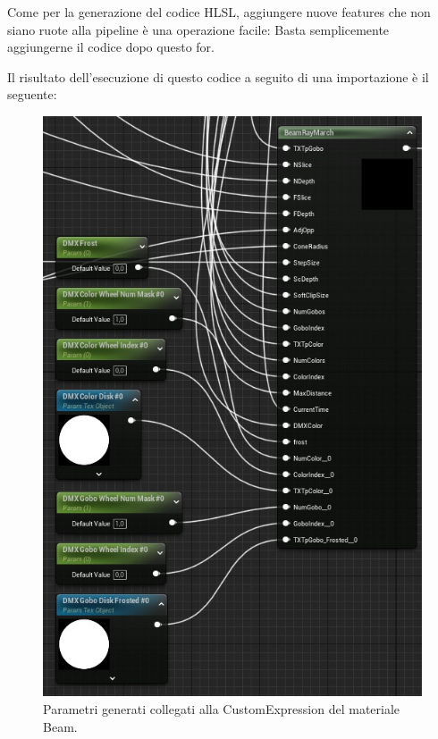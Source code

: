 \documentclass[main.tex]{subfiles}
\begin{document}
Come per la generazione del codice HLSL, aggiungere nuove features che non siano ruote alla pipeline è una operazione facile: Basta semplicemente aggiungerne il codice dopo questo for.\newline
\clearpage %

Il risultato dell'esecuzione di questo codice a seguito di una importazione è il seguente: 
\begin{figure}
    \centering
    \captionsetup{justification=centering}
    \includegraphics[scale=0.516]{img/renderingPipeline/beamMaterialGenerated.jpg}
    \caption{Parametri generati collegati alla CustomExpression del materiale Beam.}
    \label{fig:2_beamGenerated}
\end{figure}
\end{document}
